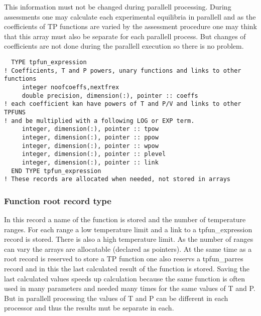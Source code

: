 \documentclass[12pt]{article}
\begin{document}
This information must not be changed during parallell processing.
During assessments one may calculate each experimental equilibria in
parallell and as the coefficients of TP functions are varied by the
assessment procedure one may think that this array must also be
separate for each parallell process.  But changes of coefficients are
not done during the parallell execution so there is no problem.

\begin{verbatim}
  TYPE tpfun_expression
! Coefficients, T and P powers, unary functions and links to other functions
     integer noofcoeffs,nextfrex
     double precision, dimension(:), pointer :: coeffs
! each coefficient kan have powers of T and P/V and links to other TPFUNS
! and be multiplied with a following LOG or EXP term.
     integer, dimension(:), pointer :: tpow
     integer, dimension(:), pointer :: ppow
     integer, dimension(:), pointer :: wpow
     integer, dimension(:), pointer :: plevel
     integer, dimension(:), pointer :: link
  END TYPE tpfun_expression
! These records are allocated when needed, not stored in arrays
\end{verbatim}

\subsubsection{Function root record type}

In this record a name of the function is stored and the number of
temperature ranges.  For each range a low temperature limit and a link
to a tpfun\_expression record is stored.  There is also a high
temperature limit.  As the number of ranges can vary the arrays are
allocatable (declared as pointers).  At the same time as a root record
is reserved to store a TP function one also reservs a tpfun\_parres
record and in this the last calculated result of the function is
stored.  Saving the last calculated values speeds up calculation
because the same function is often used in many parameters and needed
many times for the same values of T and P.  But in parallell
processing the values of T and P can be different in each processor
and thus the results mut be separate in each.
\end{document}
